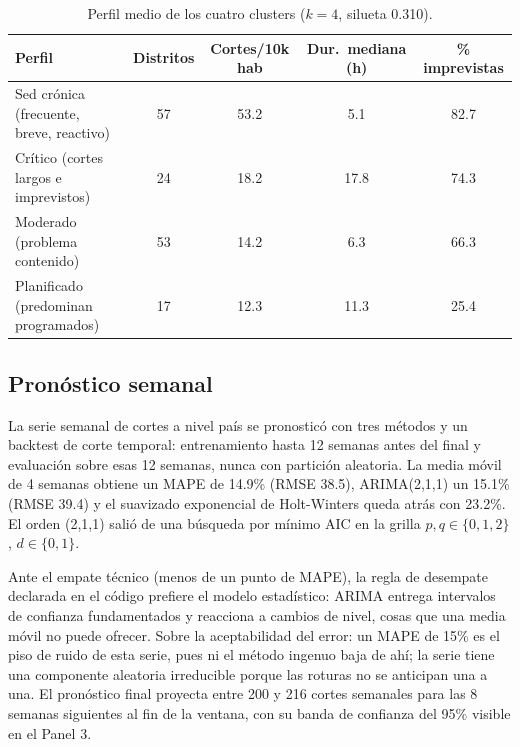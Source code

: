 \documentclass[11pt,a4paper]{article}
\begin{document}
\begin{table}[h]
      \centering
      \small
      \begin{tabular}{lcccc}
            \toprule
            \textbf{Perfil}                          & \textbf{Distritos} & \textbf{Cortes/10k hab} & \textbf{Dur.\ mediana (h)} & \textbf{\% imprevistas} \\
            \midrule
            Sed crónica (frecuente, breve, reactivo) & 57                 & 53.2                    & 5.1                        & 82.7                    \\
            Crítico (cortes largos e imprevistos)    & 24                 & 18.2                    & 17.8                       & 74.3                    \\
            Moderado (problema contenido)            & 53                 & 14.2                    & 6.3                        & 66.3                    \\
            Planificado (predominan programados)     & 17                 & 12.3                    & 11.3                       & 25.4                    \\
            \bottomrule
      \end{tabular}
      \caption{Perfil medio de los cuatro clusters ($k=4$, silueta 0.310).}
      \label{tab:clusters}
\end{table}

\subsection{Pronóstico semanal}
\label{sec:series}

La serie semanal de cortes a nivel país se pronosticó con tres métodos y un
backtest de corte temporal: entrenamiento hasta 12 semanas antes del final y
evaluación sobre esas 12 semanas, nunca con partición aleatoria. La media móvil
de 4 semanas obtiene un MAPE de 14.9\% (RMSE 38.5), ARIMA(2,1,1) un 15.1\%
(RMSE 39.4) y el suavizado exponencial de Holt-Winters queda atrás con 23.2\%.
El orden (2,1,1) salió de una búsqueda por mínimo AIC en la grilla
$p,q \in \{0,1,2\}$, $d \in \{0,1\}$.

Ante el empate técnico (menos de un punto de MAPE), la regla de desempate
declarada en el código prefiere el modelo estadístico: ARIMA entrega intervalos
de confianza fundamentados y reacciona a cambios de nivel, cosas que una media
móvil no puede ofrecer. Sobre la aceptabilidad del error: un MAPE de 15\% es
el piso de ruido de esta serie, pues ni el método ingenuo baja de ahí; la serie
tiene una componente aleatoria irreducible porque las roturas no se anticipan
una a una. El pronóstico final proyecta entre 200 y 216 cortes semanales para
las 8 semanas siguientes al fin de la ventana, con su banda de confianza del
95\% visible en el Panel 3.
\end{document}
